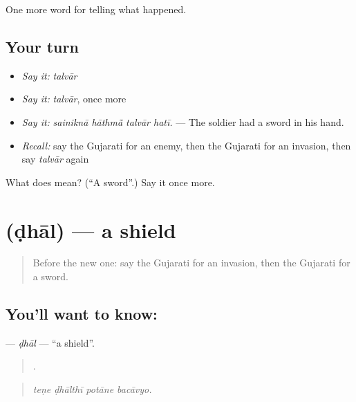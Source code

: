 \begin{grammarlens}[title={What you've built}]
One more word for telling what happened.
\end{grammarlens}

\subsection*{Your turn}
\begin{itemize}
\raggedright
  \item \emph{Say it:} \emph{talvār}
  \item \emph{Say it:} \emph{talvār}, once more
  \item \emph{Say it:} \emph{sainiknā hāthmā̃ talvār hatī.} — The soldier had a sword in his hand.
  \item \emph{Recall:} say the Gujarati for an enemy, then the Gujarati for an invasion, then say \emph{talvār} again
\end{itemize}

\begin{tcolorbox}[breakable,colback=teal!4,colframe=teal!35!black,title={Before you move on}]
What does  mean? (\textquotedblleft{}A sword\textquotedblright{}.) Say it once more.
\end{tcolorbox}
\section[\texorpdfstring{\gu{ઢાલ} (ḍhāl)}{ઢાલ (ḍhāl)}]{ (ḍhāl) — a shield}

\label{lesson:GU-C321-dhal}



\begin{quote}
Before the new one: say the Gujarati for an invasion, then the Gujarati for a sword.
\end{quote}

\subsection*{You'll want to know: }
\textbf{} — \emph{ḍhāl} — \textquotedblleft{}a shield\textquotedblright{}.

\begin{quote}
   .
\end{quote}

\begin{quote}
\emph{teṇe ḍhālthī potāne bacāvyo.}
\end{quote}

